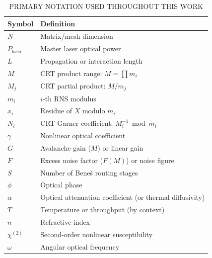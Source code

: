 \documentclass[journal]{IEEEtran}
\begin{document}
\begin{table}[H]
\centering
\caption{PRIMARY NOTATION USED THROUGHOUT THIS WORK}
\label{tab:table22}
\scriptsize
\setlength{\tabcolsep}{3pt}
\begin{tabular}{ll}
\toprule
Symbol & Definition \\
\midrule
$N$ & Matrix/mesh dimension \\
$P_{\text{laser}}$ & Master laser optical power \\
$L$ & Propagation or interaction length \\
$M$ & CRT product range: $M = \prod m_i$ \\
$M_j$ & CRT partial product: $M/m_j$ \\
$m_i$ & $i$-th RNS modulus \\
$x_i$ & Residue of $X$ modulo $m_i$ \\
$N_i$ & CRT Garner coefficient: $M_i^{-1} \bmod m_i$ \\
$\gamma$ & Nonlinear optical coefficient \\
$G$ & Avalanche gain ($M$) or linear gain \\
$F$ & Excess noise factor ($F(M)$) or noise figure \\
$S$ & Number of Bene\v{s} routing stages \\
$\phi$ & Optical phase \\
$\alpha$ & Optical attenuation coefficient (or thermal diffusivity) \\
$T$ & Temperature or throughput (by context) \\
$n$ & Refractive index \\
$\chi^{(2)}$ & Second-order nonlinear susceptibility \\
$\omega$ & Angular optical frequency \\
\bottomrule
\end{tabular}
\end{table}



\end{document}
